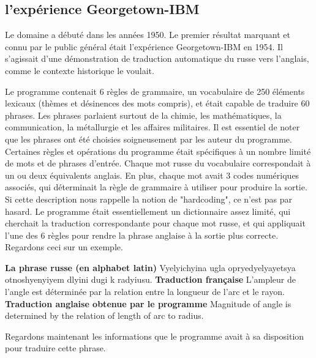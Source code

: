 \documentclass[11pt, a4paper]{report}
\begin{document}
    \subsection{l'expérience Georgetown-IBM}
    \cite{wikipedia-nlp}
    \cite{wikipedia-georgetown} 
    \cite{hutchins-georgetown}
Le domaine a débuté dans les années 1950. Le premier résultat 
marquant et connu par le public général était l'expérience Georgetown-IBM en 1954. Il s'agissait d'une 
démonstration de traduction automatique du russe vers l'anglais, comme le 
contexte historique le voulait.

Le programme contenait 6 règles de grammaire, un vocabulaire de 250 éléments lexicaux 
(thèmes et désinences des mots compris), et était capable de traduire 60 
phrases. Les phrases parlaient surtout de la chimie, les mathématiques, la 
communication, la métallurgie et les affaires militaires. Il est essentiel de 
noter que les phrases ont été choisies soigneusement par les auteur du programme. 
Certaines règles et opérations du programme était spécifiques à un nombre limité 
de mots et de phrases d'entrée. Chaque mot russe du vocabulaire correspondait à un ou deux 
équivalents anglais. En plus, chaque mot avait 3 codes numériques associés, qui 
déterminait la règle de grammaire à utiliser pour produire la sortie. 
Si cette description nous rappelle la notion de 
"hardcoding", ce n'est pas par hasard. Le programme était essentiellement un 
dictionnaire assez limité, qui cherchait la traduction correspondante pour chaque 
mot russe, et qui appliquait l'une des 6 règles pour rendre la phrase anglaise 
à la sortie plus correcte. Regardons ceci sur un exemple. 

\noindent \textbf{La phrase russe (en alphabet latin)} \newline 
Vyelyichyina ugla opryedyelyayetsya otnoshyenyiyem dlyini dugi k radyiusu. \newline  
\textbf{Traduction française} \newline 
L'ampleur de l'angle est déterminée par la relation entre la longueur de l'arc et le rayon. \newline 
\textbf{Traduction anglaise obtenue par le programme} \newline 
Magnitude of angle is determined by the relation of length of arc to radius.

Regardons maintenant les informations que le programme avait à sa disposition pour traduire 
cette phrase. 
\end{document}
